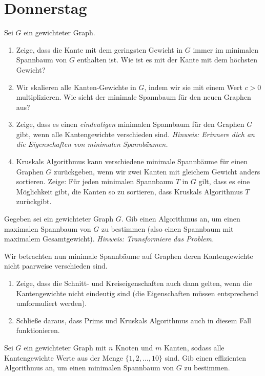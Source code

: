\documentclass{uebung_cs}
\begin{document}
\section*{Donnerstag}
\begin{aufgabe}
	Sei $G$ ein gewichteter Graph.
	\begin{enumerate}
		\item Zeige, dass die Kante mit dem geringsten Gewicht in $G$ immer im minimalen Spannbaum von $G$ enthalten ist.
		Wie ist es mit der Kante mit dem höchsten Gewicht? 
		\item Wir skalieren alle Kanten-Gewichte in $G$, indem wir sie mit einem Wert $c>0$ multiplizieren.
		Wie sieht der minimale Spannbaum für den neuen Graphen aus?
		\item Zeige, dass es einen \emph{eindeutigen} minimalen Spannbaum für den Graphen $G$ gibt, wenn alle Kantengewichte verschieden sind.
		\textit{Hinweis: Erinnere dich an die Eigenschaften von minimalen Spannbäumen.}
		\item Kruskals Algorithmus kann verschiedene minimale Spannbäume für einen Graphen $G$ zurückgeben, wenn wir zwei Kanten mit gleichem Gewicht anders sortieren.
		Zeige: Für jeden minimalen Spannbaum $T$ in $G$ gilt, dass es eine Möglichkeit gibt, die Kanten so zu sortieren, dass Kruskals Algorithmus $T$ zurückgibt.
	\end{enumerate}
\end{aufgabe}


\begin{aufgabe}
	Gegeben sei ein gewichteter Graph $G$. Gib einen Algorithmus an, um einen maximalen Spannbaum von $G$ zu bestimmen (also einen Spannbaum mit maximalem Gesamtgewicht).
	\emph{Hinweis: Transformiere das Problem.}
\end{aufgabe}


\begin{aufgabe}
	Wir betrachten nun minimale Spannbäume auf Graphen deren Kantengewichte nicht paarweise verschieden sind.
	\begin{enumerate}
		\item Zeige, dass die Schnitt- und Kreiseigenschaften auch dann gelten, wenn die Kantengewichte nicht eindeutig sind (die Eigenschaften müssen entsprechend umformuliert werden).
		\item Schließe daraus, dass Prims und Kruskals Algorithmus auch in diesem Fall funktionieren.
	\end{enumerate}
\end{aufgabe}

\begin{aufgabe}
	Sei $G$ ein gewichteter Graph mit $n$ Knoten und $m$ Kanten, sodass alle Kantengewichte Werte aus der Menge $\{ 1, 2, \ldots , 10\}$ sind.
	Gib einen effizienten Algorithmus an, um einen minimalen Spannbaum von $G$ zu bestimmen.
\end{aufgabe}
\end{document}
